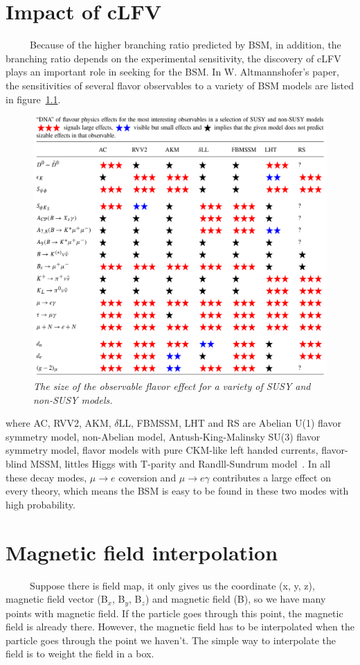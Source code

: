 \chapter{Impact of cLFV}
~~~~~Because of the higher branching ratio predicted by BSM, in addition, the branching ratio depends on the experimental sensitivity, the discovery of cLFV plays an important role in seeking for the BSM.
In W. Altmannshofer's paper, the sensitivities of several flavor observables to a variety of BSM models are listed in figure~\ref{predict}.
\begin{figure}[H]
 \centering
 \includegraphics[scale=0.7]{chapter1/fig/predict.pdf}
 \caption{\it The size of the observable flavor effect for a variety of SUSY and non-SUSY models.}
 \label{predict}
\end{figure}
where AC, RVV2, AKM, $\delta$LL, FBMSSM, LHT and RS are Abelian U(1) flavor symmetry model, non-Abelian model, Antush-King-Malinsky SU(3) flavor symmetry model, flavor models with pure CKM-like left handed currents, flavor-blind MSSM, littles Higgs with T-parity and Randll-Sundrum model~\cite{wolf}.
In all these decay modes, $\mu \rightarrow e$ coversion and $\mu \rightarrow e\gamma$ contributes a large effect on every theory, which means the BSM is easy to be found in these two modes with high probability.

\chapter{Magnetic field interpolation}
~~~~~Suppose there is field map, it only gives us the coordinate (x, y, z), magnetic field vector (B$_x$, B$_y$, B$_z$) and magnetic field (B), so we have many points with magnetic field.
If the particle goes through this point, the magnetic field is already there.
However, the magnetic field has to be interpolated when the particle goes through the point we haven't.
The simple way to interpolate the field is to weight the field in a box.

